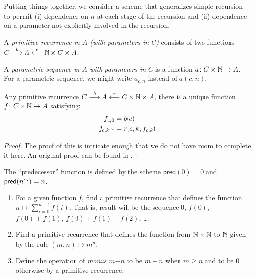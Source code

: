 Putting things together, we consider a scheme that generalizes simple recursion to permit (i) dependence on $n$ at each stage of the recursion and (ii) dependence on a parameter not explicitly involved in the recursion.

\begin{defn}
	A \emph{primitive recurrence in $A$ (with parameters in $C$)} consists of two  functions $C\stackrel{b}{\longrightarrow} A\stackrel{r}{\longleftarrow}\mathbb N\times C\times A$.
	
	A \emph{parametric sequence in $A$ with parameters in $C$} is a function
	${a}\colon{C\times \mathbb N}\to{A}$. For a parametric sequence, we might write $a_{c,n}$
	instead of $a(c,n)$. 
\end{defn}

\begin{lemma}
	Any primitive recurrence $C \stackrel{b}{\longrightarrow} A \stackrel{r}{\longleftarrow} C\times \mathbb N \times A$, there is a unique
	function ${f}\colon{C\times \mathbb N}\to{A}$ satisfying: 
	\begin{align*}
		f_{c,0} &= b(c)\\
		f_{c,k^\curvearrowright} &= r(c,k,f_{c,k})
	\end{align*}

	\begin{proof}
		The proof of this is intricate enough that we do not have room to complete it here. 
		An original proof can be found in \cite{freyd66}.
	\end{proof}
\end{lemma}

\newcommand{\pred}{\mathord{\textsf{pred}}}

The ``predecessor'' function is defined by the scheme $\pred(0)=0$ and $\pred(n^\nxt) = n$. 

\begin{exercises}
\begin{enumerate}
	\item For a given function $f$, find a primitive recurrence that defines the function $n\mapsto \sum_{i=0}^{n-1}f(i)$. That is, result will be the sequence $0$, $f(0)$, $f(0)+f(1)$, $f(0)+f(1)+f(2)$, \ldots.
	\item Find a primitive recurrence that defines the function from $\mathbb N\times \mathbb N$ to $\mathbb N$ given by the rule $(m,n)\mapsto m^n$.
	\item Define the operation of \emph{monus} $m\stackrel{.}{-} n$ to be $m-n$ when $m \geq n$ and to be $0$ otherwise by  a primitive recurrence.
\end{enumerate}
\end{exercises}

